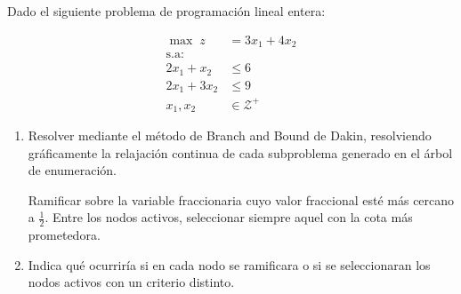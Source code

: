 Dado el siguiente problema de programación lineal entera:

\begin{align*}
\max \; z &= 3x_1 + 4x_2 \\
\text{s.a:     } & \quad\\
2x_1 + x_2 &\le 6 \\
2x_1 + 3x_2 &\le 9 \\
x_1, x_2 &\in \mathcal{Z^+}
\end{align*}

\begin{enumerate}[label=\alph*)]

\item Resolver mediante el método de Branch and Bound de Dakin,  resolviendo gráficamente la relajación continua de cada subproblema generado en el árbol de enumeración.

Ramificar sobre la variable fraccionaria cuyo valor fraccional esté más cercano a $\tfrac{1}{2}$.
Entre los nodos activos, seleccionar siempre aquel con la cota más prometedora.

\item Indica qué ocurriría si en cada nodo se ramificara  o si se seleccionaran los nodos activos con un criterio distinto.
\begin{center}
\end{center}

\end{enumerate}